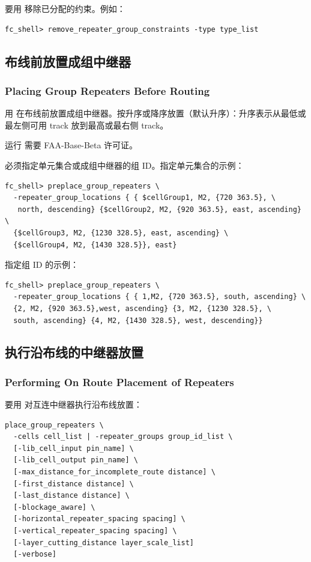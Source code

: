 要用  移除已分配的约束。例如：
\begin{lstlisting}
fc_shell> remove_repeater_group_constraints -type type_list
\end{lstlisting}

\subsection{布线前放置成组中继器}
\subsubsection*{Placing Group Repeaters Before Routing}

用  在布线前放置成组中继器。按升序或降序放置（默认升序）：升序表示从最低或最左侧可用 track 放到最高或最右侧 track。

\begin{noteBox}
运行  需要 FAA-Base-Beta 许可证。
\end{noteBox}

必须指定单元集合或成组中继器的组 ID。指定单元集合的示例：
\begin{lstlisting}
fc_shell> preplace_group_repeaters \
  -repeater_group_locations { { $cellGroup1, M2, {720 363.5}, \
   north, descending} {$cellGroup2, M2, {920 363.5}, east, ascending} \
  {$cellGroup3, M2, {1230 328.5}, east, ascending} \
  {$cellGroup4, M2, {1430 328.5}}, east}
\end{lstlisting}

指定组 ID 的示例：
\begin{lstlisting}
fc_shell> preplace_group_repeaters \
  -repeater_group_locations { { 1,M2, {720 363.5}, south, ascending} \
  {2, M2, {920 363.5},west, ascending} {3, M2, {1230 328.5}, \
  south, ascending} {4, M2, {1430 328.5}, west, descending}}
\end{lstlisting}

\subsection{执行沿布线的中继器放置}
\subsubsection*{Performing On Route Placement of Repeaters}

要用 \cmd{place\_group\_repeaters} 对互连中继器执行沿布线放置：
\begin{lstlisting}
place_group_repeaters \
  -cells cell_list | -repeater_groups group_id_list \
  [-lib_cell_input pin_name] \
  [-lib_cell_output pin_name] \
  [-max_distance_for_incomplete_route distance] \
  [-first_distance distance] \
  [-last_distance distance] \
  [-blockage_aware] \
  [-horizontal_repeater_spacing spacing] \
  [-vertical_repeater_spacing spacing] \
  [-layer_cutting_distance layer_scale_list]
  [-verbose]
\end{lstlisting}

